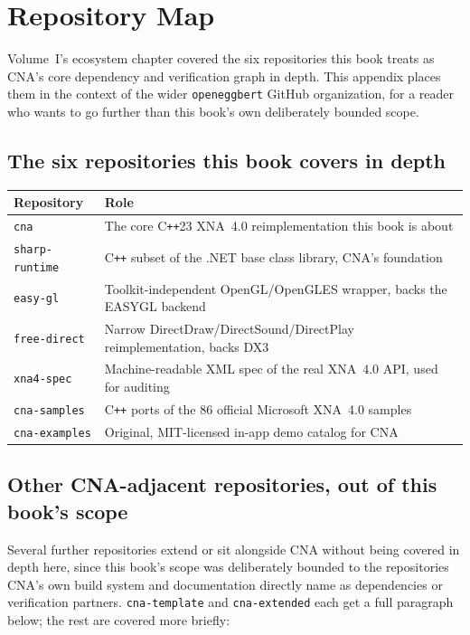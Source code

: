 \chapter{Repository Map}
\label{ch:repo-map}

Volume~I's ecosystem chapter covered the six repositories this book treats as CNA's core
dependency and verification graph in depth. This appendix places them in the context of the
wider \texttt{openeggbert} GitHub organization, for a reader who wants to go further than this
book's own deliberately bounded scope.

\section{The six repositories this book covers in depth}

\begin{center}
\begin{tabular}{ll}
\toprule
\textbf{Repository} & \textbf{Role} \\
\midrule
\texttt{cna} & The core C\texttt{++}23 XNA~4.0 reimplementation this book is about \\
\texttt{sharp-runtime} & C\texttt{++} subset of the .NET base class library, CNA's foundation \\
\texttt{easy-gl} & Toolkit-independent OpenGL/OpenGLES wrapper, backs the EASYGL backend \\
\texttt{free-direct} & Narrow DirectDraw/DirectSound/DirectPlay reimplementation, backs DX3 \\
\texttt{xna4-spec} & Machine-readable XML spec of the real XNA~4.0 API, used for auditing \\
\texttt{cna-samples} & C\texttt{++} ports of the 86 official Microsoft XNA~4.0 samples \\
\texttt{cna-examples} & Original, MIT-licensed in-app demo catalog for CNA \\
\bottomrule
\end{tabular}
\end{center}

\section{Other CNA-adjacent repositories, out of this book's scope}

Several further repositories extend or sit alongside CNA without being covered in depth here,
since this book's scope was deliberately bounded to the repositories CNA's own build system
and documentation directly name as dependencies or verification partners. \texttt{cna-template}
and \texttt{cna-extended} each get a full paragraph below; the rest are covered more briefly:

